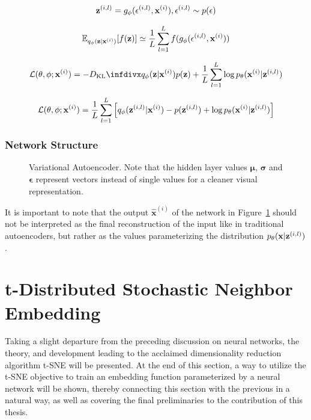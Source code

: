 $$\mathbf{z}^{(i,l)} = g_{\mathbf{\phi}}(\mathbf{\epsilon}^{(i,l)}, \mathbf{x}^{(i)}), \mathbf{\epsilon}^{(i,l)} \sim p(\mathbf{\epsilon})$$

$$\mathbb{E}_{q_{\mathbf{\phi}}(\mathbf{z} \vert \mathbf{x}^{(i)})}[f(\mathbf{z})] \simeq \frac{1}{L} \sum_{l=1}^{L} f(g_{\mathbf{\phi}}(\mathbf{\epsilon}^{(i,l)}, \mathbf{x}^{(i)}))$$

$$\mathcal{L}(\btheta, \bphi; \bxi) = -\dkl{\qphi(\bz \vert \bxi)}{p(\bz)} + \frac{1}{L} \sum_{l=1}^{L} \log \ptheta(\bxi \vert \mathbf{z}^{(i,l)})$$

$$\mathcal{L}(\mathbf{\theta}, \mathbf{\phi}; \mathbf{x}^{(i)}) = \frac{1}{L} \sum_{l=1}^{L} \Big[q_{\mathbf{\phi}}(\mathbf{z}^{(i,l)} \vert \mathbf{x}^{(i)}) - p(\mathbf{z}^{(i,l)}) + \log p_{\mathbf{\theta}}(\mathbf{x}^{(i)} \vert \mathbf{z}^{(i,l)})\Big]$$

\subsubsection{Network Structure}

\begin{figure}[!htb]
  \centering
  \resizebox{\textwidth}{!}{\unskip}
  \caption{Variational Autoencoder. Note that the hidden layer values $\mathbf{\mu}$, $\mathbf{\sigma}$ and $\mathbf{\epsilon}$ represent vectors instead of single values for a cleaner visual representation.}
  \label{fig:vae}
\end{figure}

It is important to note that the output $\hat{\mathbf{x}}^{(i)}$ of the network in Figure~\ref{fig:vae} should not be interpreted as the final reconstruction of the input like in traditional autoencoders, but rather as the values parameterizing the distribution $p_{\mathbf{\theta}}(\mathbf{x} \vert \mathbf{z}^{(i, l)})$.


\section{t-Distributed Stochastic Neighbor Embedding}
\label{section:tsne}

Taking a slight departure from the preceding discussion on neural networks, the theory, and development leading to the acclaimed dimensionality reduction algorithm t-SNE will be presented. At the end of this section, a way to utilize the t-SNE objective to train an embedding function parameterized by a neural network will be shown, thereby connecting this section with the previous in a natural way, as well as covering the final preliminaries to the contribution of this thesis.

